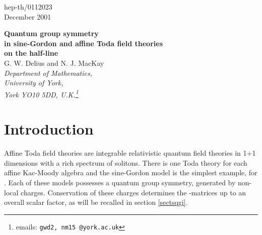 \documentclass[a4paper,12pt]{article}
\providecommand{\uqgh}{U_q(\hat{g})}
\numberwithin{equation}{section}
\begin{document}
\baselineskip 16pt
\parindent 10pt
\parskip 6pt


\begin{flushright}
hep-th/0112023\\ December 2001\\[3mm]
\end{flushright}
\vspace{1cm}
\begin{center}
{\Large {\bf Quantum group symmetry \\[0.05in]in sine-Gordon and
affine Toda field theories\\
[0.1in]on the half-line}}\\ \vspace{1cm} {\large G. W. Delius and
N. J. MacKay}
\\
\vspace{3mm} {\em Department of Mathematics,\\ University of York,
\\York YO10 5DD, U.K.\footnote{emails: {\tt gwd2, nm15 @york.ac.uk} }}
\end{center}

\begin{abstract}
\noindent We consider the sine-Gordon and affine Toda field
theories on the half-line with classically integrable boundary
conditions, and show that in the quantum theory a remnant survives
of the bulk quantized affine algebra symmetry generated by
non-local charges. The paper also develops a general framework for
obtaining solutions of the reflection equation by solving an
intertwining property for representations of certain coideal
subalgebras of \myHighlight{$\uqgh$}\coordHE{}.
\end{abstract}

\section{Introduction\label{sectint}}

Affine Toda field theories are integrable relativistic quantum
field theories in 1+1 dimensions with a rich spectrum of solitons.
There is one Toda theory for each affine Kac-Moody algebra
\coordHE{} and the sine-Gordon model is the simplest example, for
\coordHE{}.
Each of these models possesses a quantum group symmetry, generated
by non-local charges. Conservation of these charges determines the
\coordHE{}-matrices up to an overall scalar factor, as will be recalled
in section \ref{sectsqgi}.
\end{document}
